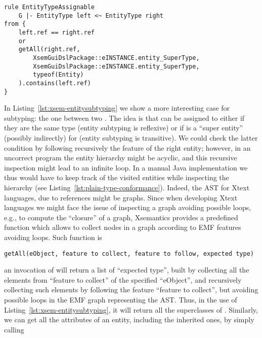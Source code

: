 \begin{lstlisting}[language=xsemantics,float,label=lst:xsem-entitysubtyping,caption=Rule
for \mytt{isAssignable} for entity types.] 
rule EntityTypeAssignable
	G |- EntityType left <~ EntityType right
from {
	left.ref == right.ref
	or
	getAll(right.ref, 
		XsemGuiDslPackage::eINSTANCE.entity_SuperType,
		XsemGuiDslPackage::eINSTANCE.entity_SuperType,
		typeof(Entity)
	).contains(left.ref)
}
\end{lstlisting}

In Listing~\ref{lst:xsem-entitysubtyping} we show a more interesting case for
subtyping: the one between two .  The idea is that 
can be assigned to  either if they are the same type (entity
subtyping is reflexive) or if  is a ``super entity'' (possibly
indirectly) for  (entity subtyping is transitive).  We could check
the latter condition by following recursively the feature  of
the right entity; however, in an uncorrect program the entity hierarchy might be
acyclic, and this recursive inspection might lead to an infinite loop.  In a
manual Java implementation we thus would have to keep track of the visited
entities while inspecting the hierarchy (see
Listing~\ref{lst:plain-type-conformance}).  Indeed, the AST for Xtext languages,
due to references might be graphs.  Since when developing Xtext languages we
might face the issue of inspecting a graph avoiding possible loops, e.g., to
compute the ``closure'' of a graph, Xsemantics provides a predefined function
which allows to collect nodes in a graph according to EMF features avoiding
loops.  Such function is

\begin{small}
\begin{verbatim}
getAll(eObject, feature to collect, feature to follow, expected type)
\end{verbatim}
\end{small}

\noindent an invocation of  will return a list of ``expected
type'', built by collecting all the elements from ``feature to collect'' of the
specified ``eObject'', and recursively collecting such elements by following the
feature ``feature to collect'', but avoiding possible loops in the EMF graph
representing the AST.
Thus, in the use of Listing~\ref{lst:xsem-entitysubtyping}, it will return all
the superclasses of .  Similarly, we can get all the attributes of
an entity, including the inherited ones, by simply calling

